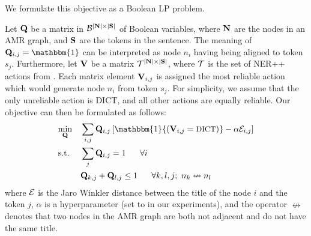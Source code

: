 


We formulate this objective as a Boolean LP problem.

Let $\mathbf{Q}$ be a matrix in $\mathcal{B}^{|\mathbf{N}| \times |\mathbf{S}|}$ of Boolean variables,
  where $\mathbf{N}$ are the 
  nodes in an AMR graph, and $\mathbf{S}$ are the tokens in the sentence.
The meaning of $\bQ_{i,j} = \mathbbm{1}$ can be interpreted as node 
  $n_i$ having being aligned to token $s_j$.
Furthermore, let $\mathbf{V}$ be a matrix $\mathcal{T}^{|\mathbf{N}| \times |\mathbf{S}|}$, where
  $\mathcal{T}$ is the set of NER++ actions from .
Each matrix element $\mathbf{V}_{i,j}$ is assigned the most reliable action which would
  generate node $n_i$ from token $s_j$.
For simplicity, we assume that the only unreliable action is DICT, and all other
  actions are equally reliable.
Our objective can then be formulated as follows:
\begin{align}
  \label{eqn:objective}
  & \underset{\bQ}{\textrm{min}}
     & & \sum_{i,j} \bQ_{i,j} \left[ 
         \mathbbm{1}{(\bV_{i,j} = \textrm{\small{DICT}})}
         - \alpha \sE_{i,j} \right] \\
  \label{eqn:constraint1}
  & \textrm{s.t.}
     & & \sum_{j} \bQ_{i,j} = 1 ~~~~~ \forall i \\
  \label{eqn:constraint2}
  & & & \bQ_{k,j} + \bQ_{l,j} \leq 1 ~~~~~ \forall k,l,j; ~ n_k \nleftrightarrow n_l
\end{align}
where $\mathcal{E}$ is the Jaro Winkler distance  between the title of the node $i$ and the
  token $j$, $\alpha$ is a hyperparameter (set to  in our experiments),
  and the operator $\nleftrightarrow$ denotes that two nodes in the AMR graph are
  both not adjacent and do not have the same title.

